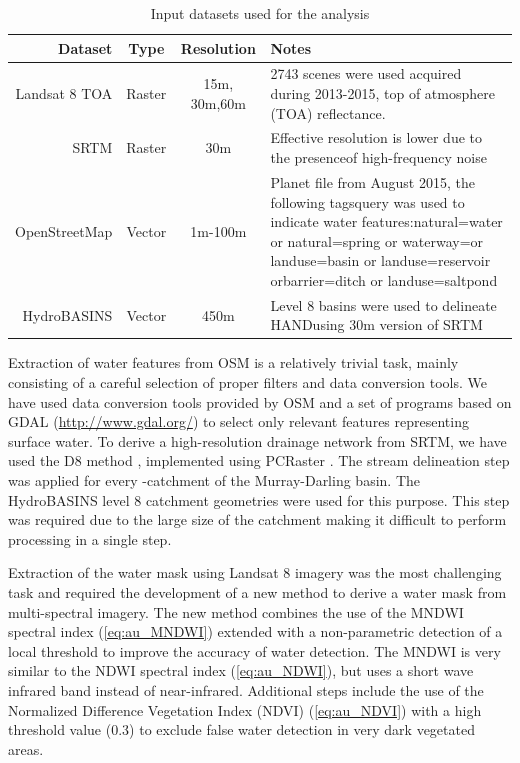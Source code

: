 \begin{table}
	\centering
	\caption{Input datasets used for the analysis}
	\label{table:au-datasets}
	\small
	\begin{tabular}{| r | c | c | C{7cm} |}
		\hline
		\textbf{Dataset} & \textbf{Type} & \textbf{Resolution} & \textbf{Notes} \\ 
		\hline
		Landsat 8 TOA & Raster & 15m, 30m,60m & 2743 scenes were used acquired during 2013-2015, top of atmosphere (TOA) reflectance. \\
		\hline
		SRTM & Raster & 30m & Effective resolution is lower due to the presenceof high-frequency noise \\ 
		\hline
		OpenStreetMap & Vector & 1m-100m & Planet file from August 2015, the following tagsquery was used to indicate water features:natural=water or natural=spring or waterway=or landuse=basin or landuse=reservoir orbarrier=ditch or landuse=saltpond \\
		\hline
		HydroBASINS & Vector & 450m & Level 8 basins were used to delineate HANDusing 30m version of SRTM \\
		\hline
	\end{tabular}
\end{table}

Extraction of water features from OSM is a relatively trivial task, mainly consisting of a careful selection of proper filters and data conversion tools. We have used data conversion tools provided by OSM and a set of programs based on GDAL (\url{http://www.gdal.org/}) to select only relevant features representing surface water. 
To derive a high-resolution drainage network from SRTM, we have used the D8 method \citet{OCallaghan1984}, implemented using PCRaster \citet{Karssenberg2010}. The stream delineation step was applied for every -catchment of the Murray-Darling basin. The HydroBASINS level 8 catchment geometries were used for this purpose. This step was required due to the large size of the catchment making it difficult to perform processing in a single step.

Extraction of the water mask using Landsat 8 imagery was the most challenging task and required the development of a new method to derive a water mask from multi-spectral imagery. The new method combines the use of the MNDWI spectral index (\ref{eq:au_MNDWI}) extended with a non-parametric detection of a local threshold to improve the accuracy of water detection. The MNDWI is very similar to the NDWI spectral index (\ref{eq:au_NDWI}), but uses a short wave infrared band instead of near-infrared. Additional steps include the use of the Normalized Difference Vegetation Index (NDVI) \citet{Tucker1979} (\ref{eq:au_NDVI}) with a high threshold value (0.3) to exclude false water detection in very dark vegetated areas. 

